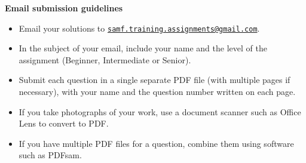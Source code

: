 \documentclass{article}
\begin{document}
\vfill
\textbf{\Large Email submission guidelines}
\begin{itemize}
	\item Email your solutions to \href{mailto:samf.training.assignments@gmail.com}{\texttt{samf.training.assignments@gmail.com}}.
	\item In the subject of your email, include your name and the level of the assignment (Beginner, Intermediate or Senior).
	\item Submit each question in a single separate PDF file (with multiple pages if necessary), with your name and the question number written on each page.
	\item If you take photographs of your work, use a document scanner such as Office Lens to convert to PDF.
	\item If you have multiple PDF files for a question, combine them using software such as PDFsam.
\end{itemize}
\end{document}
